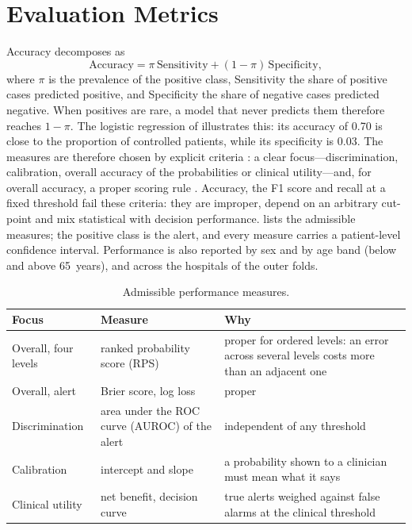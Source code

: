 \section{Evaluation Metrics}\label{sec:metrics}

Accuracy decomposes as
\begin{equation}
  \text{Accuracy} = \pi\,\text{Sensitivity} + (1-\pi)\,\text{Specificity},
\end{equation}
where $\pi$ is the prevalence of the positive class, Sensitivity the share of positive cases predicted positive, and Specificity the share of negative cases predicted negative. When positives are rare, a model that never predicts them therefore reaches $1-\pi$. The logistic regression of \textcite{mendoza2025} illustrates this: its accuracy of 0.70 is close to the proportion of controlled patients, while its specificity is 0.03. The measures are therefore chosen by explicit criteria \parencite{vancalster2025}: a clear focus---discrimination, calibration, overall accuracy of the probabilities or clinical utility---and, for overall accuracy, a proper scoring rule \parencite{gneiting2007}. Accuracy, the F1 score and recall at a fixed threshold fail these criteria: they are improper, depend on an arbitrary cut-point and mix statistical with decision performance.  lists the admissible measures; the positive class is the alert, and every measure carries a patient-level confidence interval. Performance is also reported by sex and by age band (below and above 65~years), and across the hospitals of the outer folds.

\begin{table}[htbp]
\centering\footnotesize
\caption{Admissible performance measures.}\label{tab:metrics}
\begin{tabularx}{\textwidth}{@{}>{\raggedright\arraybackslash}p{2.6cm} >{\raggedright\arraybackslash}p{4.2cm} X@{}}
\toprule
\textbf{Focus} & \textbf{Measure} & \textbf{Why} \\
\midrule
Overall, four levels & ranked probability score (RPS) \parencite{epstein1969} & proper for ordered levels: an error across several levels costs more than an adjacent one \\
Overall, alert & Brier score, log loss & proper \\
Discrimination & area under the ROC curve (AUROC) of the alert & independent of any threshold \\
Calibration & intercept and slope \parencite{vancalster2019} & a probability shown to a clinician must mean what it says \\
Clinical utility & net benefit, decision curve \parencite{vickers2006} & true alerts weighed against false alarms at the clinical threshold \\
\bottomrule
\end{tabularx}
\end{table}

